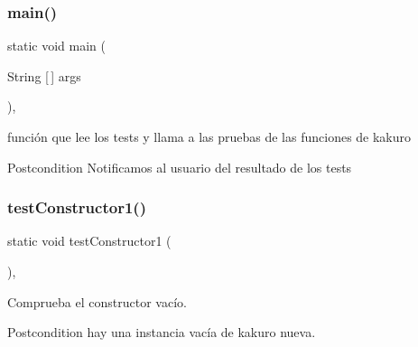 \subsubsection{main()}
{\footnotesize\ttfamily static void main (\begin{DoxyParamCaption}\item[{String [$\,$]}]{args }\end{DoxyParamCaption})\hspace{0.3cm}{\ttfamily [inline]}, {\ttfamily [static]}}



función que lee los tests y llama a las pruebas de las funciones de kakuro 

\begin{DoxyPostcond}{Postcondition}
Notificamos al usuario del resultado de los tests 
\end{DoxyPostcond}
\mbox{\label{class_dominio_1_1controladores_1_1_drivers_1_1_driver_kakuro_a6ff5d8ddaf3d8106a0d83f8cf237db84}} 
\subsubsection{test\+Constructor1()}
{\footnotesize\ttfamily static void test\+Constructor1 (\begin{DoxyParamCaption}{ }\end{DoxyParamCaption})\hspace{0.3cm}{\ttfamily [inline]}, {\ttfamily [static]}}



Comprueba el constructor vacío. 

\begin{DoxyPostcond}{Postcondition}
hay una instancia vacía de kakuro nueva. 
\end{DoxyPostcond}
\mbox{\label{class_dominio_1_1controladores_1_1_drivers_1_1_driver_kakuro_ab104c334157d9136ccef52d15e33a95c}} 
